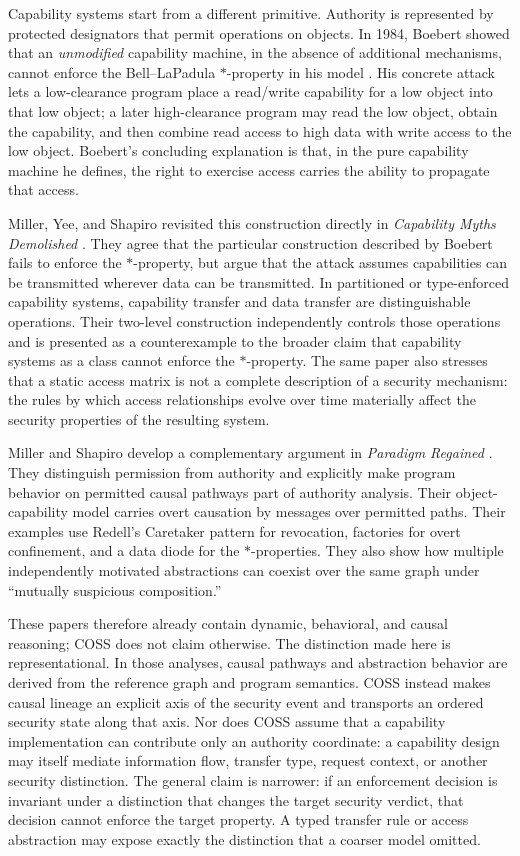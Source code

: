 \documentclass[10pt,twocolumn]{article}
\newcommand{\Model}{\textnormal{\textsc{COSS}}\xspace}
\begin{document}
Capability systems start from a different primitive. Authority is represented
by protected designators that permit operations on objects. In 1984, Boebert
showed that an \emph{unmodified} capability machine, in the absence of
additional mechanisms, cannot enforce the Bell--LaPadula $*$-property in his
model \cite{boebert1984}. His concrete attack lets a low-clearance program place
a read/write capability for a low object into that low object; a later
high-clearance program may read the low object, obtain the capability, and then
combine read access to high data with write access to the low object.  Boebert's
concluding explanation is that, in the pure capability machine he defines, the
right to exercise access carries the ability to propagate that access.

Miller, Yee, and Shapiro revisited this construction directly in
\emph{Capability Myths Demolished} \cite{miller_yee_shapiro2003}.  They agree
that the particular construction described by Boebert fails to enforce the
$*$-property, but argue that the attack assumes capabilities can be transmitted
wherever data can be transmitted.  In partitioned or type-enforced capability
systems, capability transfer and data transfer are distinguishable operations.
Their two-level construction independently controls those operations and is
presented as a counterexample to the broader claim that capability systems as a
class cannot enforce the $*$-property.  The same paper also stresses that a
static access matrix is not a complete description of a security mechanism:
the rules by which access relationships evolve over time materially affect the
security properties of the resulting system.

Miller and Shapiro develop a complementary argument in \emph{Paradigm
Regained} \cite{miller_shapiro2003}.  They distinguish permission from
authority and explicitly make program behavior on permitted causal pathways
part of authority analysis.  Their object-capability model carries overt
causation by messages over permitted paths.  Their examples use Redell's
Caretaker pattern for revocation, factories for overt confinement, and a data
diode for the $*$-properties.  They also
show how multiple independently motivated abstractions can coexist over the
same graph under ``mutually suspicious composition.''

These papers therefore already contain dynamic, behavioral, and causal
reasoning; \Model does not claim otherwise.  The distinction made here is
representational.  In those analyses, causal pathways and abstraction behavior
are derived from the reference graph and program semantics.  \Model instead
makes causal lineage an explicit axis of the security event and transports an
ordered security state along that axis.  Nor does \Model assume that a
capability implementation can contribute only an authority coordinate: a
capability design may itself mediate information flow, transfer type, request
context, or another security distinction.  The general claim is narrower: if an
enforcement decision is invariant under a distinction that changes the target
security verdict, that decision cannot enforce the target property.  A typed
transfer rule or access abstraction may expose exactly the distinction that a
coarser model omitted.
\end{document}
